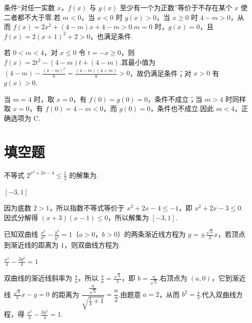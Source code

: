 \begin{solution}
条件“对任一实数 \(x\)，\(f(x)\) 与 \(g(x)\) 至少有一个为正数”等价于不存在某个 \(x\) 使二者都不大于零.若 \(m<0\)，当 \(x<0\) 时 \(g(x)>0\)，当 \(x\geqslant0\) 时 \(4-m>0\)，从而 \(f(x)=2x^2+(4-m)x+4-m>0\).\(m=0\) 时，\(g(x)=0\)，且 \(f(x)=2(x+1)^2+2>0\)，也满足条件.

若 \(0<m<4\)，对 \(x\leqslant0\) 令 \(t=-x\geqslant0\)，则 \(f(x)=2t^2-(4-m)t+(4-m)\).其最小值为 \((4-m)-\frac{(4-m)^2}{8}=\frac{(4-m)(4+m)}8>0\)，故仍满足条件；对 \(x>0\) 有 \(g(x)>0\).

当 \(m=4\) 时，取 \(x=0\)，有 \(f(0)=g(0)=0\)，条件不成立；当 \(m>4\) 时同样取 \(x=0\)，有 \(f(0)=4-m<0\)，而 \(g(0)=0\)，条件也不成立.因此 \(m<4\)，正确选项为 C.
\end{solution}

\section{填空题}

\begin{problem}
不等式 \(2^{x^2 + 2x - 4} \leqslant \frac{1}{2}\) 的解集为\fillinblank{}.
\end{problem}

\begin{answer}
\([-3,1]\)
\end{answer}

\begin{solution}
因为底数 \(2>1\)，所以指数不等式等价于 \(x^2+2x-4\leqslant-1\)，即 \(x^2+2x-3\leqslant0\).因式分解得 \((x+3)(x-1)\leqslant0\)，所以解集为 \([-3,1]\).
\end{solution}

\begin{problem}
已知双曲线 \(\frac{x^2}{a^2} - \frac{y^2}{b^2} = 1\)（\(a > 0\)，\(b > 0\)）的两条渐近线方程为 \(y = \pm \frac{\sqrt{3}}{3} x\)，若顶点到渐近线的距离为 \(1\)，则双曲线方程为\fillinblank{}.
\end{problem}

\begin{answer}
\(\frac{x^2}{4} - \frac{3y^2}{4} = 1\)
\end{answer}

\begin{solution}
双曲线的渐近线斜率为 \(\frac ba\)，所以 \(\frac ba=\frac{\sqrt3}{3}\)，即 \(b=\frac a{\sqrt3}\).右顶点为 \((a,0)\)，它到渐近线 \(\frac{\sqrt3}{3}x-y=0\) 的距离为
\(\dfrac{\frac{a}{\sqrt3}}{\sqrt{\frac{1}{3}+1}}=\dfrac a2\).由题意 \(a=2\)，从而 \(b^2=\frac43\).代入双曲线方程，得 \(\frac{x^2}{4}-\frac{3y^2}{4}=1\).
\end{solution}

